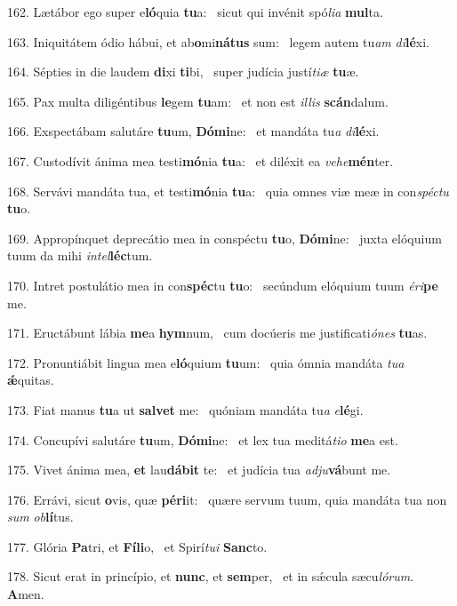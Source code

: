 162. Lætábor ego super e\textbf{ló}quia \textbf{tu}a: \ast\  sicut qui invénit spó\textit{li}\textit{a} \textbf{mul}ta.\

163. Iniquitátem ódio hábui, et ab\textbf{o}mi\textbf{ná}\textbf{tus} sum: \ast\  legem autem tu\textit{am} \textit{di}\textbf{lé}xi.\

164. Sépties in die laudem \textbf{di}xi \textbf{ti}bi, \ast\  super judícia justí\textit{ti}\textit{æ} \textbf{tu}æ.\

165. Pax multa diligéntibus \textbf{le}gem \textbf{tu}am: \ast\  et non est \textit{il}\textit{lis} \textbf{scán}dalum.\

166. Exspectábam salutáre \textbf{tu}um, \textbf{Dó}\textbf{mi}ne: \ast\  et mandáta tu\textit{a} \textit{di}\textbf{lé}xi.\

167. Custodívit ánima mea testi\textbf{mó}nia \textbf{tu}a: \ast\  et diléxit ea \textit{ve}\textit{he}\textbf{mén}ter.\

168. Servávi mandáta tua, et testi\textbf{mó}nia \textbf{tu}a: \ast\  quia omnes viæ meæ in con\textit{spéc}\textit{tu} \textbf{tu}o.\

169. Appropínquet deprecátio mea in conspéctu \textbf{tu}o, \textbf{Dó}\textbf{mi}ne: \ast\  juxta elóquium tuum da mihi \textit{in}\textit{tel}\textbf{léc}tum.\

170. Intret postulátio mea in con\textbf{spéc}tu \textbf{tu}o: \ast\  secúndum elóquium tuum \textit{é}\textit{ri}\textbf{pe} me.\

171. Eructábunt lábia \textbf{me}a \textbf{hym}num, \ast\  cum docúeris me justificati\textit{ó}\textit{nes} \textbf{tu}as.\

172. Pronuntiábit lingua mea e\textbf{ló}quium \textbf{tu}um: \ast\  quia ómnia mandáta \textit{tu}\textit{a} \textbf{ǽ}quitas.\

173. Fiat manus \textbf{tu}a ut \textbf{sal}\textbf{vet} me: \ast\  quóniam mandáta tu\textit{a} \textit{e}\textbf{lé}gi.\

174. Concupívi salutáre \textbf{tu}um, \textbf{Dó}\textbf{mi}ne: \ast\  et lex tua meditá\textit{ti}\textit{o} \textbf{me}a est.\

175. Vivet ánima mea, \textbf{et} lau\textbf{dá}\textbf{bit} te: \ast\  et judícia tua \textit{ad}\textit{ju}\textbf{vá}bunt me.\

176. Errávi, sicut \textbf{o}vis, quæ \textbf{pér}\textbf{i}it: \ast\  quære servum tuum, quia mandáta tua non \textit{sum} \textit{ob}\textbf{lí}tus.\

177. Glória \textbf{Pa}tri, et \textbf{Fí}\textbf{li}o, \ast\  et Spirí\textit{tu}\textit{i} \textbf{Sanc}to.\

178. Sicut erat in princípio, et \textbf{nunc}, et \textbf{sem}per, \ast\  et in sǽcula sæcu\textit{ló}\textit{rum}. \textbf{A}men.\


